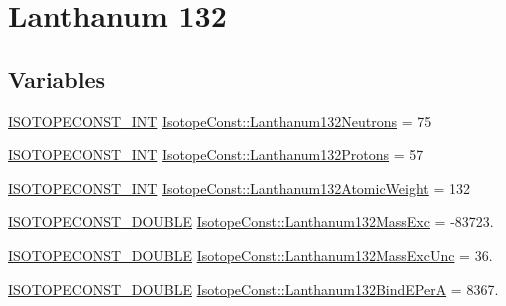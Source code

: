 \hypertarget{group___isotope_const-_lanthanum-_la132}{}\section{Lanthanum 132}
\label{group___isotope_const-_lanthanum-_la132}
\subsection*{Variables}
\begin{DoxyCompactItemize}
\item 
\mbox{\hyperlink{group___isotope_const-_macros_ga5f18360b3e99483a35c32d789e62621c}{I\+S\+O\+T\+O\+P\+E\+C\+O\+N\+S\+T\+\_\+\+I\+NT}} \mbox{\hyperlink{group___isotope_const-_lanthanum-_la132_gad3afcb8d995748b7962da03a8c590642}{Isotope\+Const\+::\+Lanthanum132\+Neutrons}} = 75
\item 
\mbox{\hyperlink{group___isotope_const-_macros_ga5f18360b3e99483a35c32d789e62621c}{I\+S\+O\+T\+O\+P\+E\+C\+O\+N\+S\+T\+\_\+\+I\+NT}} \mbox{\hyperlink{group___isotope_const-_lanthanum-_la132_ga02d54c86a250f7e9a6d0bad17d8aceae}{Isotope\+Const\+::\+Lanthanum132\+Protons}} = 57
\item 
\mbox{\hyperlink{group___isotope_const-_macros_ga5f18360b3e99483a35c32d789e62621c}{I\+S\+O\+T\+O\+P\+E\+C\+O\+N\+S\+T\+\_\+\+I\+NT}} \mbox{\hyperlink{group___isotope_const-_lanthanum-_la132_gacda93d8eca7ae011665dc08cb6784c66}{Isotope\+Const\+::\+Lanthanum132\+Atomic\+Weight}} = 132
\item 
\mbox{\hyperlink{group___isotope_const-_macros_ga8f45a7272ce02c0b4c65c44636ed719a}{I\+S\+O\+T\+O\+P\+E\+C\+O\+N\+S\+T\+\_\+\+D\+O\+U\+B\+LE}} \mbox{\hyperlink{group___isotope_const-_lanthanum-_la132_gadcb4c15c4b6c701fd99332e0be24931d}{Isotope\+Const\+::\+Lanthanum132\+Mass\+Exc}} = -\/83723.
\item 
\mbox{\hyperlink{group___isotope_const-_macros_ga8f45a7272ce02c0b4c65c44636ed719a}{I\+S\+O\+T\+O\+P\+E\+C\+O\+N\+S\+T\+\_\+\+D\+O\+U\+B\+LE}} \mbox{\hyperlink{group___isotope_const-_lanthanum-_la132_gae82e3f8ce8f0bcbd8a619cfdb2fe3b3f}{Isotope\+Const\+::\+Lanthanum132\+Mass\+Exc\+Unc}} = 36.
\item 
\mbox{\hyperlink{group___isotope_const-_macros_ga8f45a7272ce02c0b4c65c44636ed719a}{I\+S\+O\+T\+O\+P\+E\+C\+O\+N\+S\+T\+\_\+\+D\+O\+U\+B\+LE}} \mbox{\hyperlink{group___isotope_const-_lanthanum-_la132_ga2b69c44b3e02f89f58aaa269a42e7ec7}{Isotope\+Const\+::\+Lanthanum132\+Bind\+E\+PerA}} = 8367.
\item 

\end{DoxyCompactItemize}
